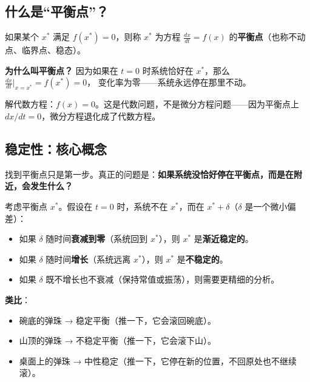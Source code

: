 \documentclass[12pt,a4paper]{article}
\begin{document}
\subsection{什么是``平衡点''？}

\begin{theorybox}
如果某个 $x^*$ 满足 $f(x^*) = 0$，则称 $x^*$ 为方程 $\frac{dx}{dt} = f(x)$ 的\textbf{平衡点}（也称不动点、临界点、稳态）。
\end{theorybox}

\textbf{为什么叫平衡点？} 因为如果在 $t=0$ 时系统恰好在 $x^*$，那么 $\frac{dx}{dt}\big|_{x=x^*} = f(x^*) = 0$，
变化率为零——系统永远停在那里不动。

\begin{theorybox}[寻找平衡点的方法]
解代数方程：$f(x) = 0$。这是代数问题，不是微分方程问题——因为平衡点上 $dx/dt = 0$，微分方程退化成了代数方程。
\end{theorybox}

\subsection{稳定性：核心概念}

找到平衡点只是第一步。真正的问题是：\textbf{如果系统没恰好停在平衡点，而是在附近，会发生什么？}

\begin{theorybox}
考虑平衡点 $x^*$。假设在 $t = 0$ 时，系统不在 $x^*$，而在 $x^* + \delta$（$\delta$ 是一个微小偏差）：
\begin{itemize}
  \item 如果 $\delta$ 随时间\textbf{衰减到零}（系统回到 $x^*$），则 $x^*$ 是\textbf{渐近稳定的}。
  \item 如果 $\delta$ 随时间\textbf{增长}（系统远离 $x^*$），则 $x^*$ 是\textbf{不稳定的}。
  \item 如果 $\delta$ 既不增长也不衰减（保持常值或振荡），则需要更精细的分析。
\end{itemize}
\end{theorybox}

\textbf{类比}：
\begin{itemize}
  \item 碗底的弹珠 → 稳定平衡（推一下，它会滚回碗底）。
  \item 山顶的弹珠 → 不稳定平衡（推一下，它会滚下山）。
  \item 桌面上的弹珠 → 中性稳定（推一下，它停在新的位置，不回原处也不继续滚）。
\end{itemize}
\end{document}
